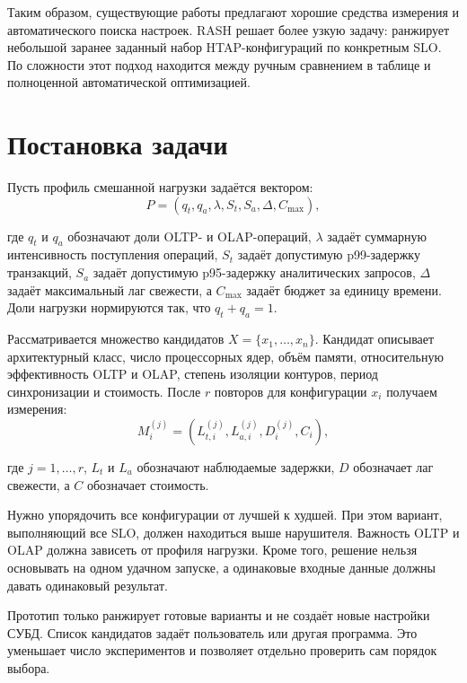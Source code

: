 \documentclass{misisarticle}
\begin{document}
	Таким образом, существующие работы предлагают хорошие средства измерения и автоматического поиска настроек. RASH решает более узкую задачу: ранжирует небольшой заранее заданный набор HTAP-конфигураций по конкретным SLO. По сложности этот подход находится между ручным сравнением в таблице и полноценной автоматической оптимизацией.

\section{Постановка задачи}

	Пусть профиль смешанной нагрузки задаётся вектором:
\begin{equation}
 P=(q_t,q_a,\lambda,S_t,S_a,\Delta,C_{\max}),
 \label{eq:profile}
\end{equation}

	где $q_t$ и $q_a$ обозначают доли OLTP- и OLAP-операций, $\lambda$ задаёт суммарную интенсивность поступления операций, $S_t$ задаёт допустимую p99-задержку транзакций, $S_a$ задаёт допустимую p95-задержку аналитических запросов, $\Delta$ задаёт максимальный лаг свежести, а $C_{\max}$ задаёт бюджет за единицу времени. Доли нагрузки нормируются так, что $q_t+q_a=1$.

	Рассматривается множество кандидатов $X=\{x_1,\ldots,x_n\}$. Кандидат описывает архитектурный класс, число процессорных ядер, объём памяти, относительную эффективность OLTP и OLAP, степень изоляции контуров, период синхронизации и стоимость. После $r$ повторов для конфигурации $x_i$ получаем измерения:
\begin{equation}
 M_i^{(j)}=(L_{t,i}^{(j)},L_{a,i}^{(j)},D_i^{(j)},C_i),
 \label{eq:measurement}
\end{equation}

	где $j=1,\ldots,r$, $L_t$ и $L_a$ обозначают наблюдаемые задержки, $D$ обозначает лаг свежести, а $C$ обозначает стоимость.

	Нужно упорядочить все конфигурации от лучшей к худшей. При этом вариант, выполняющий все SLO, должен находиться выше нарушителя. Важность OLTP и OLAP должна зависеть от профиля нагрузки. Кроме того, решение нельзя основывать на одном удачном запуске, а одинаковые входные данные должны давать одинаковый результат.

	Прототип только ранжирует готовые варианты и не создаёт новые настройки СУБД. Список кандидатов задаёт пользователь или другая программа. Это уменьшает число экспериментов и позволяет отдельно проверить сам порядок выбора.
\end{document}
